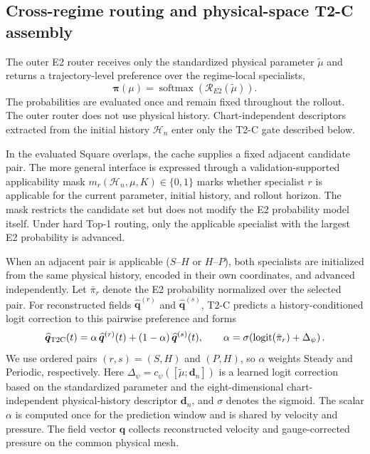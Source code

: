 \documentclass{article}
\begin{document}
\subsection{Cross-regime routing and physical-space T2-C assembly}

The outer E2 router receives only the standardized physical parameter $\widetilde\mu$ and returns a trajectory-level preference over the
regime-local specialists,
\[
\bm\pi(\mu)
=
\operatorname{softmax}\!\left(
\mathcal R_{E2}(\widetilde\mu)
\right).
\]
The probabilities are evaluated once and remain fixed throughout the rollout. The outer router does not use physical history. Chart-independent descriptors extracted from the initial history $\mathcal H_n$ enter only the T2-C gate described below.

In the evaluated Square overlaps, the cache supplies a fixed adjacent candidate pair. The more general interface is expressed through a validation-supported applicability mask $m_r(\mathcal H_n,\mu,K)\in\{0,1\}$ marks whether specialist $r$ is applicable for the current parameter, initial history, and rollout horizon. The mask restricts the candidate set but does not modify the E2 probability
model itself. Under hard Top-1 routing, only the applicable specialist with the largest E2 probability is advanced.

When an adjacent pair is applicable ($S$--$H$ or $H$--$P$), both specialists are initialized from the same physical history, encoded in
their own coordinates, and advanced independently. Let $\bar\pi_r$ denote the E2 probability normalized over the selected pair. For reconstructed fields $\widehat{\bm q}^{(r)}$ and $\widehat{\bm q}^{(s)}$, T2-C predicts a history-conditioned logit correction to this pairwise preference and forms
\begin{equation}
  \widehat{\bm q}_{\rm T2C}(t)
  =\alpha\,\widehat{\bm q}^{(r)}(t)
  +(1-\alpha)\,\widehat{\bm q}^{(s)}(t),
  \qquad
  \alpha=
  \sigma\!\left(
  \operatorname{logit}(\bar\pi_r)+\Delta_\psi
  \right).
  \label{eq:main_t2c}
\end{equation}
We use ordered pairs $(r,s)=(S,H)$ and $(P,H)$, so $\alpha$ weights Steady and Periodic, respectively. Here $\Delta_\psi=c_\psi([\widetilde\mu;\bm d_n])$ is a learned logit correction based on the standardized parameter and the eight-dimensional chart-independent physical-history descriptor $\bm d_n$, and $\sigma$ denotes the sigmoid. The scalar $\alpha$ is computed once for the prediction window and is shared by velocity and pressure. The field vector $\bm q$ collects reconstructed velocity and gauge-corrected pressure on the common physical mesh.
\end{document}
